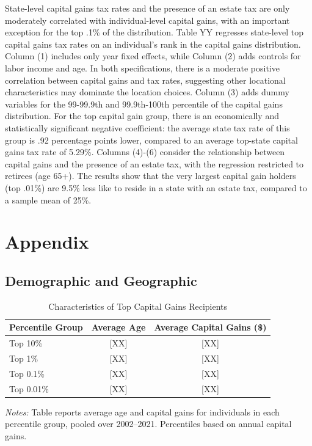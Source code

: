\documentclass[12pt]{article}
\begin{document}
State-level capital gains tax rates and the presence of an estate tax are only moderately correlated with individual-level capital gains, with an important exception for the top .1\% of the distribution. Table YY regresses state-level top capital gains tax rates on an individual's rank in the capital gains distribution. Column (1) includes only year fixed effects, while Column (2) adds controls for labor income and age. In both specifications, there is a moderate positive correlation between capital gains and tax rates, suggesting other locational characteristics may dominate the location choices. Column (3) adds dummy variables for the 99-99.9th and 99.9th-100th percentile of the capital gains distribution. For the top capital gain group, there is an economically and statistically significant negative coefficient: the average state tax rate of this group is .92 percentage points lower, compared to an average top-state capital gains tax rate of 5.29\%.  Columns (4)-(6) consider the relationship between capital gains and the presence of an estate tax, with the regression restricted to retirees (age 65+). The results show that the very largest capital gain holders (top .01\%) are 9.5\% less like to reside in a state with an estate tax, compared to a sample mean of 25\%. 

\section{Appendix}


\subsection{Demographic and Geographic}

\begin{table}[H]
\centering
\caption{Characteristics of Top Capital Gains Recipients}
\label{tab:kg_percentile}
\small
\begin{tabular}{lcc}
\toprule
Percentile Group & Average Age & Average Capital Gains (\$) \\
\midrule
Top 10\%   & [XX] & [XX] \\
Top 1\%    & [XX] & [XX] \\
Top 0.1\%  & [XX] & [XX] \\
Top 0.01\% & [XX] & [XX] \\
\bottomrule
\end{tabular}
\begin{minipage}{0.9\textwidth}
\vspace{0.5em}
\footnotesize
\textit{Notes:} Table reports average age and capital gains for individuals in each percentile group, pooled over 2002--2021. Percentiles based on annual capital gains.
\end{minipage}
\end{table}
\end{document}
